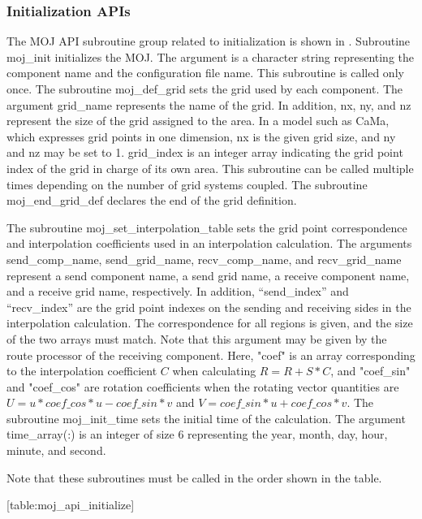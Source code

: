 \hypertarget{initialization-apis}{%
\subsubsection{Initialization APIs}\label{initialization-apis}}

The MOJ API subroutine group related to initialization is shown in .
Subroutine moj\_init initializes the MOJ. The argument is a character
string representing the component name and the configuration file name.
This subroutine is called only once. The subroutine moj\_def\_grid sets
the grid used by each component. The argument grid\_name represents the
name of the grid. In addition, nx, ny, and nz represent the size of the
grid assigned to the area. In a model such as CaMa, which expresses grid
points in one dimension, nx is the given grid size, and ny and nz may be
set to 1. grid\_index is an integer array indicating the grid point
index of the grid in charge of its own area. This subroutine can be
called multiple times depending on the number of grid systems coupled.
The subroutine moj\_end\_grid\_def declares the end of the grid
definition.

The subroutine moj\_set\_interpolation\_table sets the grid point
correspondence and interpolation coefficients used in an interpolation
calculation. The arguments send\_comp\_name, send\_grid\_name,
recv\_comp\_name, and recv\_grid\_name represent a send component name,
a send grid name, a receive component name, and a receive grid name,
respectively. In addition, ``send\_index'' and ``recv\_index'' are the
grid point indexes on the sending and receiving sides in the
interpolation calculation. The correspondence for all regions is given,
and the size of the two arrays must match. Note that this argument may
be given by the route processor of the receiving component. Here, "coef"
is an array corresponding to the interpolation coefficient \(C\) when
calculating \(R = R + S * C\), and "coef\_sin" and "coef\_cos" are
rotation coefficients when the rotating vector quantities are
\(U = u*coef\_cos*u-coef\_sin*v\) and \(V = coef\_sin*u + coef\_cos*v\).
The subroutine moj\_init\_time sets the initial time of the calculation.
The argument time\_array(:) is an integer of size 6 representing the
year, month, day, hour, minute, and second.

Note that these subroutines must be called in the order shown in the
table.

\protect\hypertarget{table:moj_api_initialize}{}{{[}table:moj\_api\_initialize{]}}

